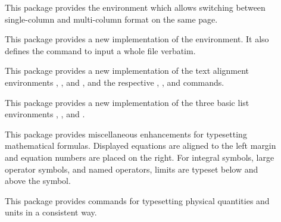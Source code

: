 \documentclass{scrartcl}
\begin{document}
\begin{description}
\item[\href{https://mirrors.ctan.org/macros/latex/required/tools/multicol.pdf}{}]
This package provides the  environment which allows
switching between single-column and multi-column format on the same
page.

\item[\href{https://mirrors.ctan.org/macros/latex/required/tools/verbatim.pdf}{}]
This package provides a new implementation of the 
environment.  It also defines the \symb{} command to
input a whole file verbatim.

\item[\href{https://mirrors.ctan.org/macros/latex/contrib/ragged2e/ragged2e.pdf}{}]
This package provides a new implementation of the text alignment
environments , , and ,
and the respective \symb{\centering}, \symb{\raggedleft}, and
\symb{\raggedright} commands.

\item[\href{https://mirrors.ctan.org/macros/latex/contrib/enumitem/enumitem.pdf}{}]
This package provides a new implementation of the three basic list
environments , , and .

\item[\href{https://mirrors.ctan.org/macros/latex/required/amsmath/amsldoc.pdf}{}]
This package provides miscellaneous enhancements for typesetting
mathematical formulas.  Displayed equations are aligned to the left
margin and equation numbers are placed on the right.  For integral
symbols, large operator symbols, and named operators, limits are
typeset below and above the symbol.

\item[\href{https://mirrors.ctan.org/macros/latex/contrib/siunitx/siunitx.pdf}{}]
This package provides commands for typesetting physical quantities and
units in a consistent way.


\end{description}
\end{document}
